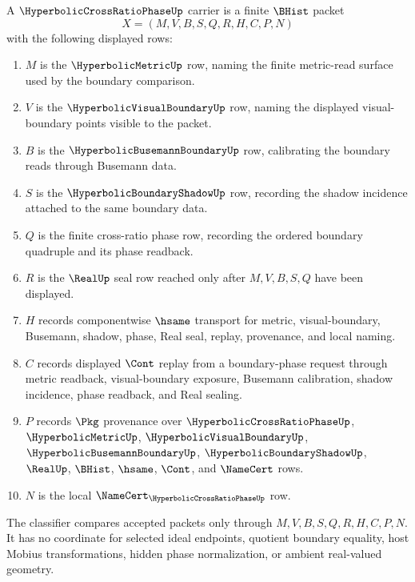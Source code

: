 \begin{definition}
\label{def:hyperbolic-cross-ratio-phase-carrier}
A $\HyperbolicCrossRatioPhaseUp$ carrier is a finite $\BHist$ packet
$$
X=(M,V,B,S,Q,R,H,C,P,N)
$$
with the following displayed rows:
\begin{enumerate}
\item $M$ is the $\HyperbolicMetricUp$ row, naming the finite metric-read surface used by the boundary comparison.
\item $V$ is the $\HyperbolicVisualBoundaryUp$ row, naming the displayed visual-boundary points visible to the packet.
\item $B$ is the $\HyperbolicBusemannBoundaryUp$ row, calibrating the boundary reads through Busemann data.
\item $S$ is the $\HyperbolicBoundaryShadowUp$ row, recording the shadow incidence attached to the same boundary data.
\item $Q$ is the finite cross-ratio phase row, recording the ordered boundary quadruple and its phase readback.
\item $R$ is the $\RealUp$ seal row reached only after $M,V,B,S,Q$ have been displayed.
\item $H$ records componentwise $\hsame$ transport for metric, visual-boundary, Busemann, shadow, phase, Real seal, replay, provenance, and local naming.
\item $C$ records displayed $\Cont$ replay from a boundary-phase request through metric readback, visual-boundary exposure, Busemann calibration, shadow incidence, phase readback, and Real sealing.
\item $P$ records $\Pkg$ provenance over $\HyperbolicCrossRatioPhaseUp$, $\HyperbolicMetricUp$, $\HyperbolicVisualBoundaryUp$, $\HyperbolicBusemannBoundaryUp$, $\HyperbolicBoundaryShadowUp$, $\RealUp$, $\BHist$, $\hsame$, $\Cont$, and $\NameCert$ rows.
\item $N$ is the local $\NameCert_{\HyperbolicCrossRatioPhaseUp}$ row.
\end{enumerate}
The classifier compares accepted packets only through $M,V,B,S,Q,R,H,C,P,N$. It has no coordinate for selected ideal endpoints, quotient boundary equality, host Mobius transformations, hidden phase normalization, or ambient real-valued geometry.
\end{definition}

